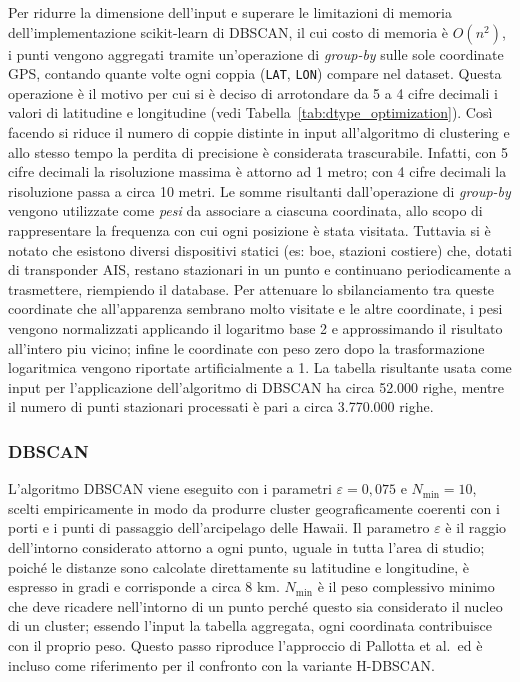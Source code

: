 Per ridurre la dimensione dell'input e superare le limitazioni di memoria dell'implementazione scikit-learn di DBSCAN, 
il cui costo di memoria è $O(n^2)$, i punti vengono aggregati tramite un'operazione di \emph{group-by} sulle sole coordinate GPS, 
contando quante volte ogni coppia (\texttt{LAT}, \texttt{LON}) compare nel dataset. Questa operazione è il motivo per cui si è deciso
di arrotondare da 5 a 4 cifre decimali i valori di latitudine e longitudine (vedi Tabella~\ref{tab:dtype_optimization}). 
Così facendo si riduce il numero di coppie distinte in input all'algoritmo di clustering e allo stesso tempo la perdita di precisione
è considerata trascurabile. Infatti, con 5 cifre decimali la risoluzione massima è attorno ad 1 metro; con 4 cifre decimali la risoluzione 
passa a circa 10 metri.
Le somme risultanti dall'operazione di \emph{group-by} vengono utilizzate come \emph{pesi} da associare a ciascuna coordinata, allo scopo
di rappresentare la frequenza con cui ogni posizione è stata visitata.
Tuttavia si è notato che esistono diversi dispositivi statici (es: boe, stazioni costiere) che, dotati di transponder AIS, restano stazionari
in un punto e continuano periodicamente a trasmettere, riempiendo il database. 
Per attenuare lo sbilanciamento tra queste coordinate che all'apparenza sembrano molto visitate e le altre coordinate, 
i pesi vengono normalizzati applicando il logaritmo base 2 e approssimando il risultato all'intero piu vicino; 
infine le coordinate con peso zero dopo la trasformazione logaritmica vengono riportate artificialmente a 1.
La tabella risultante usata come input per l'applicazione dell'algoritmo di DBSCAN ha circa 52.000 righe, mentre il numero di 
punti stazionari processati è pari a circa 3.770.000 righe.


\subsubsection{DBSCAN}
 
L'algoritmo DBSCAN viene eseguito con i parametri $\varepsilon = 0{,}075$ e $N_{\min} = 10$, scelti empiricamente 
in modo da produrre cluster geograficamente coerenti con i porti e i punti di passaggio dell'arcipelago delle Hawaii.
Il parametro $\varepsilon$ è il raggio dell'intorno considerato attorno a ogni punto, uguale in tutta l'area di studio;
poiché le distanze sono calcolate direttamente su latitudine e longitudine, è espresso in gradi e corrisponde a circa 8 km.
$N_{\min}$ è il peso complessivo minimo che deve ricadere nell'intorno di un punto perché questo sia considerato
il nucleo di un cluster; essendo l'input la tabella aggregata, ogni coordinata contribuisce con il proprio peso. 
Questo passo riproduce l'approccio di Pallotta et al.\ ed è incluso come riferimento per il confronto con la variante H-DBSCAN\@.

